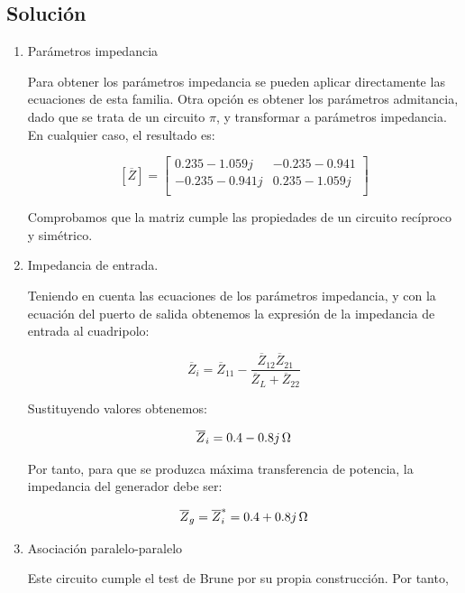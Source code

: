 \documentclass[12pt]{article}
\begin{document}
\vspace*{1cm}

\clearpage

\subsection*{Solución}

\begin{enumerate}
\item Parámetros impedancia

  Para obtener los parámetros impedancia se pueden aplicar directamente las ecuaciones de esta familia. Otra opción es obtener los parámetros admitancia, dado que se trata de un circuito $\pi$, y transformar a parámetros impedancia. En cualquier caso, el resultado es:

\[
  [\overline{Z}] = 
  \left[
    \begin{array}{cc}
      0.235 - 1.059j & -0.235 - 0.941\\
      -0.235-0.941j & 0.235 - 1.059j\\
    \end{array}
  \right]
\]

Comprobamos que la matriz cumple las propiedades de un circuito recíproco y simétrico.

\item Impedancia de entrada.

  Teniendo en cuenta las ecuaciones de los parámetros impedancia, y con la ecuación del puerto de salida obtenemos la expresión de la impedancia de entrada al cuadripolo:

  \[
    \overline{Z}_i = \overline{Z}_{11} - \frac{\overline{Z}_{12} \overline{Z}_{21}}{\overline{Z}_L + \overline{Z}_{22}}
  \]

  Sustituyendo valores obtenemos:

  \[
    \overline{Z}_i = \SI[parse-numbers=false]{0.4 - 0.8j}{\ohm}
  \]

  Por tanto, para que se produzca máxima transferencia de potencia, la impedancia del generador debe ser:

  \[
    \overline{Z}_g = \overline{Z}_i^* = \SI[parse-numbers=false]{0.4 + 0.8j}{\ohm}
  \]
  
\item Asociación paralelo-paralelo

  Este circuito cumple el test de Brune por su propia construcción. Por tanto,


\end{enumerate}
\end{document}
